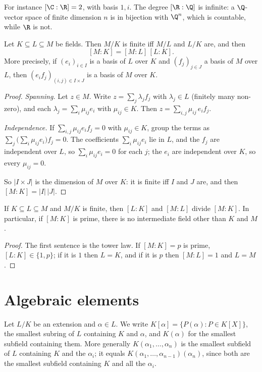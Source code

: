 For instance $[\C:\R]=2$, with basis $1,i$. The degree $[\R:\Q]$ is infinite: a $\Q$-vector space of finite dimension $n$ is in bijection with $\Q^n$, which is countable, while $\R$ is not.

\begin{theorem}\label{thm:tower}
Let $K\subseteq L\subseteq M$ be fields. Then $M/K$ is finite iff $M/L$ and $L/K$ are, and then
\[
[M:K]=[M:L]\,[L:K].
\]
More precisely, if $(e_i)_{i\in I}$ is a basis of $L$ over $K$ and $(f_j)_{j\in J}$ a basis of $M$ over $L$, then $(e_if_j)_{(i,j)\in I\times J}$ is a basis of $M$ over $K$.
\end{theorem}
\begin{proof}
\emph{Spanning.} Let $z\in M$. Write $z=\sum_j\lambda_jf_j$ with $\lambda_j\in L$ (finitely many non-zero), and each $\lambda_j=\sum_i\mu_{ij}e_i$ with $\mu_{ij}\in K$. Then $z=\sum_{i,j}\mu_{ij}\,e_if_j$.

\emph{Independence.} If $\sum_{i,j}\mu_{ij}e_if_j=0$ with $\mu_{ij}\in K$, group the terms as $\sum_j\bigl(\sum_i\mu_{ij}e_i\bigr)f_j=0$. The coefficients $\sum_i\mu_{ij}e_i$ lie in $L$, and the $f_j$ are independent over $L$, so $\sum_i\mu_{ij}e_i=0$ for each $j$; the $e_i$ are independent over $K$, so every $\mu_{ij}=0$.

So $|I\times J|$ is the dimension of $M$ over $K$: it is finite iff $I$ and $J$ are, and then $[M:K]=|I|\,|J|$.
\end{proof}

\begin{corollary}\label{cor:towerdiv}
If $K\subseteq L\subseteq M$ and $M/K$ is finite, then $[L:K]$ and $[M:L]$ divide $[M:K]$. In particular, if $[M:K]$ is prime, there is no intermediate field other than $K$ and $M$.
\end{corollary}
\begin{proof}
The first sentence is the tower law. If $[M:K]=p$ is prime, $[L:K]\in\{1,p\}$; if it is $1$ then $L=K$, and if it is $p$ then $[M:L]=1$ and $L=M$.
\end{proof}

\section{Algebraic elements}

Let $L/K$ be an extension and $\alpha\in L$. We write $K[\alpha]=\{P(\alpha):P\in K[X]\}$, the smallest subring of $L$ containing $K$ and $\alpha$, and $K(\alpha)$ for the smallest subfield containing them. More generally $K(\alpha_1,\dots,\alpha_n)$ is the smallest subfield of $L$ containing $K$ and the $\alpha_i$; it equals $K(\alpha_1,\dots,\alpha_{n-1})(\alpha_n)$, since both are the smallest subfield containing $K$ and all the $\alpha_i$.

